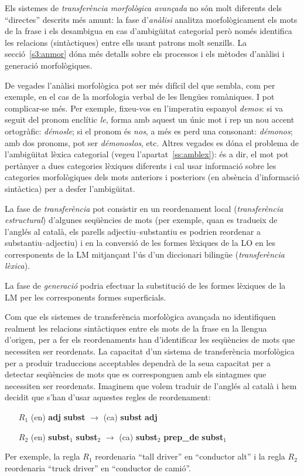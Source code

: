 Els sistemes de \emph{transferència morfològica avançada} no són molt
diferents dels ``directes'' descrits més amunt: la fase
d'\emph{anàlisi} analitza morfològicament els mots de la frase i els
desambigua en cas d'ambigüitat categorial però només identifica les
relacions (sintàctiques) entre ells usant patrons molt senzills. La
secció~\ref{s3:anmor} dóna més detalls sobre els processos i els
mètodes d'anàlisi i generació morfològiques.

De vegades l'anàlisi morfològica pot ser més difícil del que sembla,
com per exemple, en el cas de la morfologia verbal de les llengües
romàniques. I pot complicar-se més. Per exemple, fixeu-vos en
l'imperatiu espanyol \emph{demos}: si va seguit del pronom enclític
\emph{le}, forma amb aquest un únic mot i rep un nou accent
ortogràfic: \emph{démosle}; si el pronom és \emph{nos}, a més es perd
una consonant: \emph{démonos}; amb dos pronoms, pot ser {\em
  démonoslos}, etc.  Altres vegades es dóna el problema de
l'ambigüitat lèxica categorial (vegeu l'apartat~\ref{ss:amblex}): és a
dir, el mot pot pertànyer a dues categories lèxiques diferents i
cal usar informació sobre les categories morfològiques dels mots
anteriors i posteriors (en absència d'informació sintàctica) per a
desfer l'ambigüitat.

La fase de \emph{transferència} pot consistir en un reordenament local
(\emph{transferència estructural}) d'algunes seqüències de mots (per
exemple, quan es tradueix de l'anglés al català, els parells
adjectiu--substantiu es podrien reordenar a substantiu--adjectiu) i en
la conversió de les formes lèxiques de la LO en les corresponents de
la LM mitjançant l'ús d'un diccionari bilingüe (\emph{transferència
  lèxica}).

La fase de \emph{generació} podria efectuar la substitució de les
formes lèxiques de la LM per les corresponents formes superficials.

Com que els sistemes de transferència morfològica avançada no
identifiquen realment les relacions sintàctiques entre els mots de la frase en
la llengua d'origen, per a fer els reordenaments han d'identificar les
seqüències de mots que necessiten ser reordenats. La capacitat d'un
sistema de transferència morfològica per a produir traduccions
acceptables dependrà de la seua capacitat per a detectar seqüències de
mots que es corresponguen amb els sintagmes que necessiten ser
reordenats.  Imaginem que volem traduir de l'anglés al català i hem
decidit que s'han d'usar aquestes regles de reordenament:
\begin{itemize}
\item [$R_1$] (en) \textbf{adj} \textbf{subst} $\rightarrow$ (ca)
  \textbf{subst} \textbf{adj}
\item [$R_2$] (en) \textbf{subst}$_1$ \textbf{subst}$_2$ $\rightarrow$
  (ca) \textbf{subst}$_2$ \textbf{prep\_de} \textbf{subst}$_1$
\end{itemize}
Per exemple, la regla $R_1$ reordenaria ``tall driver'' en
``conductor alt'' i la regla $R_2$ reordenaria ``truck driver''
en ``conductor de camió''. 

